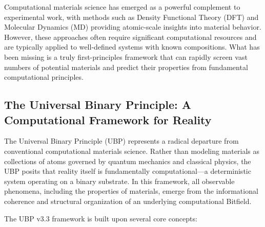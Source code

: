 \documentclass[11pt,a4paper]{article}
\begin{document}
Computational materials science has emerged as a powerful complement to experimental work, with methods such as Density Functional Theory (DFT) and Molecular Dynamics (MD) providing atomic-scale insights into material behavior. However, these approaches often require significant computational resources and are typically applied to well-defined systems with known compositions. What has been missing is a truly first-principles framework that can rapidly screen vast numbers of potential materials and predict their properties from fundamental computational principles.

\subsection{The Universal Binary Principle: A Computational Framework for Reality}

The Universal Binary Principle (UBP) represents a radical departure from conventional computational materials science. Rather than modeling materials as collections of atoms governed by quantum mechanics and classical physics, the UBP posits that reality itself is fundamentally computational—a deterministic system operating on a binary substrate. In this framework, all observable phenomena, including the properties of materials, emerge from the informational coherence and structural organization of an underlying computational Bitfield.

The UBP v3.3 framework is built upon several core concepts:
\end{document}

